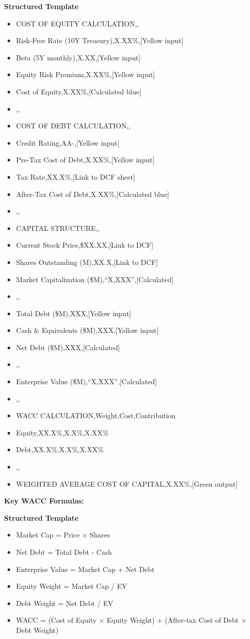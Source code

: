 \documentclass[11pt]{article}
\begin{document}
\textbf{Structured Template}
\begin{itemize}[leftmargin=*,itemsep=2pt,topsep=2pt]
\item {} COST OF EQUITY CALCULATION,,
\item {} Risk-Free Rate (10Y Treasury),X.XX\%,[Yellow input]
\item {} Beta (5Y monthly),X.XX,[Yellow input]
\item {} Equity Risk Premium,X.XX\%,[Yellow input]
\item {} Cost of Equity,X.XX\%,[Calculated blue]
\item {} ,,
\item {} COST OF DEBT CALCULATION,,
\item {} Credit Rating,AA-,[Yellow input]
\item {} Pre-Tax Cost of Debt,X.XX\%,[Yellow input]
\item {} Tax Rate,XX.X\%,[Link to DCF sheet]
\item {} After-Tax Cost of Debt,X.XX\%,[Calculated blue]
\item {} ,,
\item {} CAPITAL STRUCTURE,,
\item {} Current Stock Price,\$XX.XX,[Link to DCF]
\item {} Shares Outstanding (M),XX.X,[Link to DCF]
\item {} Market Capitalization (\$M),``X,XXX'',[Calculated]
\item {} ,,
\item {} Total Debt (\$M),XXX,[Yellow input]
\item {} Cash \& Equivalents (\$M),XXX,[Yellow input]
\item {} Net Debt (\$M),XXX,[Calculated]
\item {} ,,
\item {} Enterprise Value (\$M),``X,XXX'',[Calculated]
\item {} ,,
\item {} WACC CALCULATION,Weight,Cost,Contribution
\item {} Equity,XX.X\%,X.X\%,X.XX\%
\item {} Debt,XX.X\%,X.X\%,X.XX\%
\item {} ,,
\item {} WEIGHTED AVERAGE COST OF CAPITAL,X.XX\%,[Green output]
\end{itemize}

\textbf{Key WACC Formulas:}

\textbf{Structured Template}
\begin{itemize}[leftmargin=*,itemsep=2pt,topsep=2pt]
\item {} Market Cap = Price × Shares
\item {} Net Debt = Total Debt - Cash
\item {} Enterprise Value = Market Cap + Net Debt
\item {} Equity Weight = Market Cap / EV
\item {} Debt Weight = Net Debt / EV
\item {} WACC = (Cost of Equity × Equity Weight) + (After-tax Cost of Debt × Debt Weight)
\end{itemize}
\end{document}
